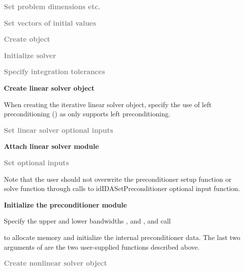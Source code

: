 {\begin{Steps}
\item
  \textcolor{gray}{\bf Set problem dimensions etc.}

\item
  \textcolor{gray}{\bf Set vectors of initial values}

\item
  \textcolor{gray}{\bf Create {\ida} object}

\item
  \textcolor{gray}{\bf Initialize {\ida} solver}

\item
  \textcolor{gray}{\bf Specify integration tolerances}

\item
  {\bf Create linear solver object}

  When creating the iterative linear solver object, specify the use of
  left preconditioning () as {\ida} only supports left preconditioning.

\item
  \textcolor{gray}{\bf Set linear solver optional inputs}

\item \label{i:bbdpre_attach}
  {\bf Attach linear solver module}

\item
  \textcolor{gray}{\bf Set optional inputs}

  Note that the user should not overwrite the preconditioner setup function
  or solve function through calls to id{IDASetPreconditioner}
  optional input function.

\item \label{i:bbdpre_init}
  {\bf Initialize the {\idabbdpre} preconditioner module}

  Specify the upper and lower bandwidths ,  and
  ,  and call


  to allocate memory and initialize the internal preconditioner data.
  The last two arguments of  are the two user-supplied
  functions described above.

\item
  \textcolor{gray}{\bf Create nonlinear solver object}


\end{Steps}}
